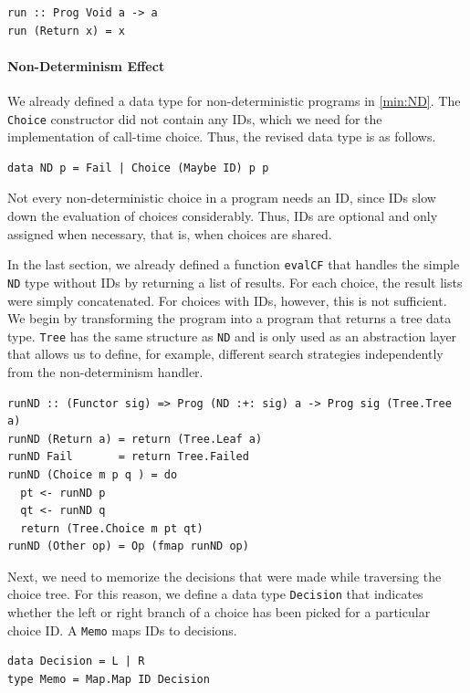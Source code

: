 \documentclass[a4paper, 11pt, fleqn, twoside]{scrreprt}
\newcommand{\hinl}[1]{\texttt{#1}}
\begin{document}
\begin{verbatim}
run :: Prog Void a -> a
run (Return x) = x
\end{verbatim}

\paragraph{Non-Determinism Effect}
We already defined a data type for non-deterministic programs in \autoref{min:ND}.
The \hinl{Choice} constructor did not contain any IDs, which we need for the implementation of call-time choice.
Thus, the revised data type is as follows.

\begin{verbatim}
data ND p = Fail | Choice (Maybe ID) p p
\end{verbatim}

Not every non-deterministic choice in a program needs an ID, since IDs slow down the evaluation of choices considerably.
Thus, IDs are optional and only assigned when necessary, that is, when choices are shared.

In the last section, we already defined a function \hinl{evalCF} that handles the simple \hinl{ND} type without IDs by returning a list of results.
For each choice, the result lists were simply concatenated.
For choices with IDs, however, this is not sufficient.
We begin by transforming the program into a program that returns a tree data type.
\hinl{Tree} has the same structure as \hinl{ND} and is only used as an abstraction layer that allows us to define, for example, different search strategies independently from the non-determinism handler.
 
\begin{verbatim}
runND :: (Functor sig) => Prog (ND :+: sig) a -> Prog sig (Tree.Tree a)
runND (Return a) = return (Tree.Leaf a)
runND Fail       = return Tree.Failed
runND (Choice m p q ) = do
  pt <- runND p
  qt <- runND q
  return (Tree.Choice m pt qt)
runND (Other op) = Op (fmap runND op)
\end{verbatim}

Next, we need to memorize the decisions that were made while traversing the choice tree.
For this reason, we define a data type \hinl{Decision} that indicates whether the left or right branch of a choice has been picked for a particular choice ID.
A \hinl{Memo} maps IDs to decisions.

\begin{verbatim}
data Decision = L | R
type Memo = Map.Map ID Decision
\end{verbatim}
\end{document}
